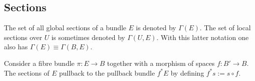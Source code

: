 \subsection{Sections}

    \begin{notation}
        The set of all global sections of a bundle $E$ is denoted by $\Gamma(E)$. The set of local sections over $U$ is sometimes denoted by $\Gamma(U,E)$. With this latter notation one also has $\Gamma(E)\equiv\Gamma(B,E)$.
    \end{notation}

    \begin{property}
        Consider a fibre bundle $\pi:E\rightarrow B$ together with a morphism of spaces $f:B'\rightarrow B$. The sections of $E$ pullback to the pullback bundle $f^*E$ by defining $f^*s := s\circ f$.
    \end{property}